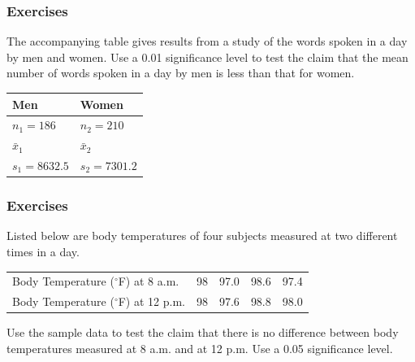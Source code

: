 \documentclass[xcolor=dvipsnames]{beamer}
\begin{document}


\begin{frame}
  \frametitle{Exercises}
 The accompanying table
gives results from a study of the words spoken in a day by men and
women. Use a 0.01 significance level to test the claim that the
mean number of words spoken in a day by men is less than that for
women.

\bigskip

\begin{tabular}{|l|l|} \hline
\textbf{Men}  & \textbf{Women} \\ \hline
$n_{1}=186$   & $n_{2}=210$    \\ \hline
$\bar{x}_{1}$ & $\bar{x}_{2}$  \\ \hline
$s_{1}=8632.5$ & $s_{2}=7301.2$ \\ \hline
\end{tabular}
\end{frame}

\begin{frame}
  \frametitle{Exercises}
 Listed below are body temperatures of four
subjects measured at two different times in a day.

\bigskip

\begin{tabular}{lrrrr}
  Body Temperature ($^{\circ}$F) at 8 a.m. & 98 & 97.0 & 98.6 & 97.4 \\
  Body Temperature ($^{\circ}$F) at 12 p.m. & 98 & 97.6 & 98.8 & 98.0
\end{tabular}

\bigskip

Use the sample data to test the claim that there is no difference
between body temperatures measured at 8 a.m. and at 12 p.m. Use a 0.05
significance level.
\end{frame}
\end{document}
